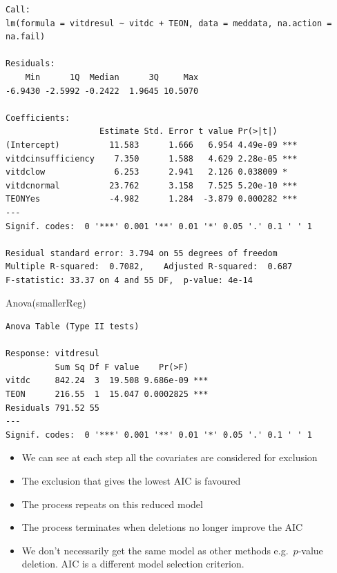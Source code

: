 \documentclass[
  oneside]{krantz}
\newenvironment{Shaded}{\begin{snugshade}}{\end{snugshade}}
\newcommand{\FunctionTok}[1]{\textcolor[rgb]{0.00,0.00,0.00}{#1}}
\newcommand{\NormalTok}[1]{#1}
\providecommand{\tightlist}{%
  \setlength{\itemsep}{0pt}\setlength{\parskip}{0pt}}
\begin{document}
\begin{verbatim}
Call:
lm(formula = vitdresul ~ vitdc + TEON, data = meddata, na.action = na.fail)

Residuals:
    Min      1Q  Median      3Q     Max 
-6.9430 -2.5992 -0.2422  1.9645 10.5070 

Coefficients:
                   Estimate Std. Error t value Pr(>|t|)    
(Intercept)          11.583      1.666   6.954 4.49e-09 ***
vitdcinsufficiency    7.350      1.588   4.629 2.28e-05 ***
vitdclow              6.253      2.941   2.126 0.038009 *  
vitdcnormal          23.762      3.158   7.525 5.20e-10 ***
TEONYes              -4.982      1.284  -3.879 0.000282 ***
---
Signif. codes:  0 '***' 0.001 '**' 0.01 '*' 0.05 '.' 0.1 ' ' 1

Residual standard error: 3.794 on 55 degrees of freedom
Multiple R-squared:  0.7082,    Adjusted R-squared:  0.687 
F-statistic: 33.37 on 4 and 55 DF,  p-value: 4e-14
\end{verbatim}

\begin{Shaded}
\begin{Highlighting}[]
\FunctionTok{Anova}\NormalTok{(smallerReg)}
\end{Highlighting}
\end{Shaded}

\begin{verbatim}
Anova Table (Type II tests)

Response: vitdresul
          Sum Sq Df F value    Pr(>F)    
vitdc     842.24  3  19.508 9.686e-09 ***
TEON      216.55  1  15.047 0.0002825 ***
Residuals 791.52 55                      
---
Signif. codes:  0 '***' 0.001 '**' 0.01 '*' 0.05 '.' 0.1 ' ' 1
\end{verbatim}

\begin{itemize}
\tightlist
\item
  We can see at each step all the covariates are considered for exclusion
\item
  The exclusion that gives the lowest AIC is favoured
\item
  The process repeats on this reduced model
\item
  The process terminates when deletions no longer improve the AIC
\item
  We don't necessarily get the same model as other methods e.g.~\(p\)-value deletion. AIC is a different model selection criterion.
\end{itemize}
\end{document}
